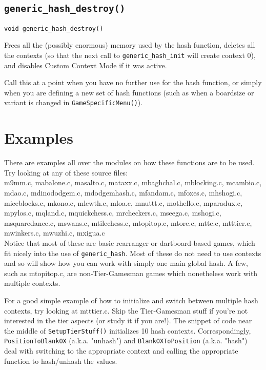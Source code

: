 \documentclass[11pt]{article}
\begin{document}
\subsection{\texttt{generic\_hash\_destroy()}}

\texttt{void generic\_hash\_destroy()}

Frees all the (possibly enormous) memory used by the hash function, deletes all the contexts (so that the next call to \texttt{generic\_hash\_init} will create context 0), and disables Custom Context Mode if it was active.

Call this at a point when you have no further use for the hash function, or simply when you are defining a new set of hash functions (such as when a boardsize or variant is changed in \texttt{GameSpecificMenu()}).


\section{Examples}

There are examples all over the modules on how these functions are to be used. Try looking at any of these source files:\\

m9mm.c, mabalone.c, masalto.c, mataxx.c, mbaghchal.c, mblocking.c, mcambio.c, mdao.c, mdinododgem.c, mdodgemhash.c, mfandam.c, mfoxes.c, mhshogi.c, miceblocks.c, mkono.c, mlewth.c, mloa.c, mnuttt.c, mothello.c, mparadux.c, mpylos.c, mqland.c, mquickchess.c, mrcheckers.c, mseega.c, mshogi.c, msquaredance.c, mswans.c, mtilechess.c, mtopitop.c, mtore.c, mttc.c, mtttier.c, mwinkers.c, mwuzhi.c, mxigua.c\\

Notice that most of these are basic rearranger or dartboard-based games, which fit nicely into the use of \texttt{generic\_hash}. Most of these do not need to use contexts and so will show how you can work with simply one main global hash. A few, such as mtopitop.c, are non-Tier-Gamesman games which nonetheless work with multiple contexts.

For a good simple example of how to initialize and switch between multiple hash contexts, try looking at mtttier.c. Skip the Tier-Gamesman stuff if you're not interested in the tier aspects (or study it if you are!). The snippet of code near the middle of \texttt{SetupTierStuff()} initializes 10 hash contexts. Correspondingly, \texttt{PositionToBlankOX} (a.k.a. "unhash") and \texttt{BlankOXToPosition} (a.k.a. "hash") deal with switching to the appropriate context and calling the appropriate function to hash/unhash the values.
\end{document}
